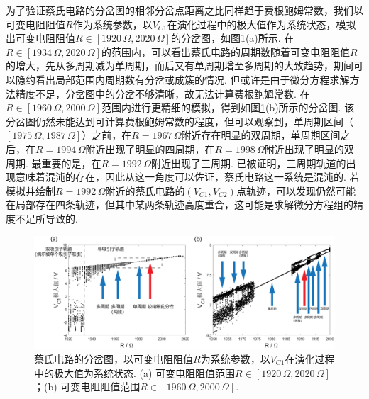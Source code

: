 \documentclass[a4paper, 10pt]{article}
\begin{document}
\begin{multicols*}{2}
为了验证蔡氏电路的分岔图的相邻分岔点距离之比同样趋于费根鲍姆常数，我们以可变电阻阻值$R$作为系统参数，以$V_{C1}$在演化过程中的极大值作为系统状态，模拟出可变电阻阻值$R\in[1920\,\Omega,2020\,\Omega]$的分岔图，如图\ref{Bifurcation}(a)所示. 在$R\in[1934\,\Omega,2020\,\Omega]$的范围内，可以看出蔡氏电路的周期数随着可变电阻阻值$R$的增大，先从多周期减为单周期，而后又有单周期增至多周期的大致趋势，期间可以隐约看出局部范围内周期数有分岔或成簇的情况. 但或许是由于微分方程求解方法精度不足，分岔图中的分岔不够清晰，故无法计算费根鲍姆常数. 在$R\in[1960\,\Omega,2000\,\Omega]$范围内进行更精细的模拟，得到如图\ref{Bifurcation}(b)所示的分岔图. 该分岔图仍然未能达到可计算费根鲍姆常数的程度，但可以观察到，单周期区间（$[1975\,\Omega,1987\,\Omega]$）之前，在$R=1967\,\Omega$附近存在明显的双周期，单周期区间之后，在$R=1994\,\Omega$附近出现了明显的四周期，在$R=1998\,\Omega$附近出现了明显的双周期. 最重要的是，在$R=1992\,\Omega$附近出现了三周期. 已被证明\cite{tien1975period}，三周期轨道的出现意味着混沌的存在，因此从这一角度可以佐证，蔡氏电路这一系统是混沌的. 若模拟并绘制$R=1992\,\Omega$附近的蔡氏电路的$(V_{C1},V_{C2})$点轨迹，可以发现仍然可能在局部存在四条轨迹，但其中某两条轨迹高度重合，这可能是求解微分方程组的精度不足所导致的.

\begin{figure}[H]
    \centering
    \includegraphics[width=\columnwidth]{Bifurcation.eps}
    \caption{蔡氏电路的分岔图，以可变电阻阻值$R$为系统参数，以$V_{C1}$在演化过程中的极大值为系统状态. (a) 可变电阻阻值范围$R\in[1920\,\Omega,2020\,\Omega]$；(b) 可变电阻阻值范围$R\in[1960\,\Omega,2000\,\Omega]$.}
    \label{Bifurcation}
\end{figure}


\end{multicols*}
\end{document}

